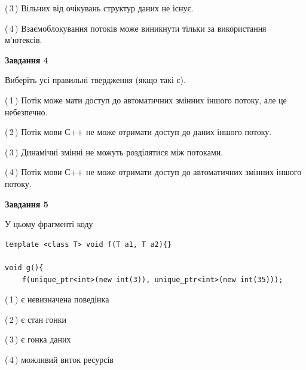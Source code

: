 \documentclass[12pt, ukrainian]{article}
\begin{document}
\begin {large}
{(\,3\,) Вільних від очікувань структур даних не існує.%

(\,4\,) Взаємоблокування потоків може виникнути тільки за використання м’ютексів.%



\begin{center}
\textbf{Завдання 4}
\end{center}
Виберіть усі правильні твердження (якщо такі є).\par
\vspace{2mm}

(\,1\,) Потік може мати доступ до автоматичних змінних іншого потоку, але це небезпечно.%

(\,2\,) Потік мови С++ не може отримати доступ до даних іншого потоку.%

(\,3\,) Динамічні змінні не можуть розділятися між потоками.%

(\,4\,) Потік мови С++ не може отримати доступ до автоматичних змінних іншого потоку.%



\begin{center}
\textbf{Завдання 5}
\end{center}
У цьому фрагменті коду
\begin{verbatim}
template <class T> void f(T a1, T a2){}

void g(){
    f(unique_ptr<int>(new int(3)), unique_ptr<int>(new int(35)));
\end{verbatim}

(\,1\,) є невизначена поведінка%

(\,2\,) є стан гонки%

(\,3\,) є гонка даних%

(\,4\,) можливий виток ресурсів%


}
\end {large}
\end{document}
